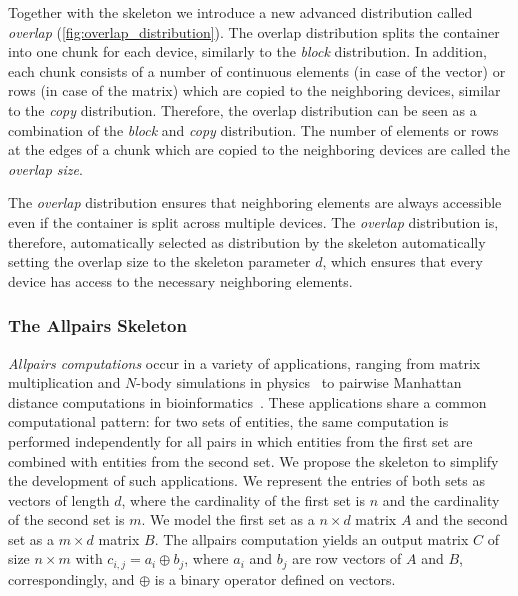 Together with the \stencil skeleton we introduce a new advanced distribution called \emph{overlap} (\autoref{fig:overlap_distribution}).
The overlap distribution splits the container into one chunk for each device, similarly to the \emph{block} distribution.
In addition, each chunk consists of a number of continuous elements (in case of the vector) or rows (in case of the matrix) which are copied to the neighboring devices, similar to the \emph{copy} distribution.
Therefore, the overlap distribution can be seen as a combination of the \emph{block} and \emph{copy} distribution.
The number of elements or rows at the edges of a chunk which are copied to the neighboring devices are called the \emph{overlap size}.

The \emph{overlap} distribution ensures that neighboring elements are always accessible even if the container is split across multiple devices.
The \emph{overlap} distribution is, therefore, automatically selected as distribution by the \stencil skeleton automatically setting the overlap size to the skeleton parameter $d$, which ensures that every device has access to the necessary neighboring elements.





\subsubsection{The Allpairs Skeleton}
\label{sec:allpairs_skeleton}

\emph{Allpairs computations} occur in a variety of applications, ranging from matrix multiplication and $N$-body simulations in physics~\cite{AroraShVu2009} to pairwise Manhattan distance computations in bioinformatics~\cite{ChangDeQuRo2009}.
These applications share a common computational pattern:
for two sets of entities, the same computation is performed independently for all pairs in which entities from the first set are combined with entities from the second set.
We propose the \allpairs skeleton to simplify the development of such applications.
We represent the entries of both sets as vectors of length $d$, where the cardinality of the first set is $n$ and the cardinality of the second set is $m$.
We model the first set as a $n\times d$ matrix $A$ and the second set as a $m\times d$ matrix $B$.
The allpairs computation yields an output matrix $C$ of size $n\times m$ with $c_{i, j} = a_i \oplus b_j$, where $a_i$ and $b_j$ are row vectors of $A$ and $B$, correspondingly,
and $\oplus$ is a binary operator defined on vectors.

